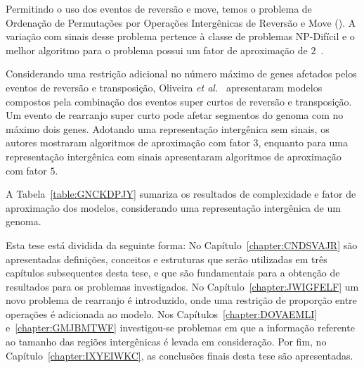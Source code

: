Permitindo o uso dos eventos de reversão e move, temos o problema de Ordenação de Permutações por Operações Intergênicas de Reversão e Move (\SbIRM). A variação com sinais desse problema pertence à classe de problemas NP-Difícil e o melhor algoritmo para o problema possui um fator de aproximação de $2$~\cite{2022b-brito-etal}.

Considerando uma restrição adicional no número máximo de genes afetados pelos eventos de reversão e transposição, Oliveira \textit{et al.}~\cite{2019c-oliveira-etal} apresentaram modelos compostos pela combinação dos eventos super curtos de reversão e transposição. Um evento de rearranjo super curto pode afetar segmentos do genoma com no máximo dois genes. Adotando uma representação intergênica sem sinais, os autores mostraram algoritmos de aproximação com fator $3$, enquanto para uma representação intergênica com sinais apresentaram algoritmos de aproximação com fator $5$.

A Tabela~\ref{table:GNCKDPJY} sumariza os resultados de complexidade e fator de aproximação dos modelos, considerando uma representação intergênica de um genoma.



Esta tese está dividida da seguinte forma: No Capítulo~\ref{chapter:CNDSVAJR} são apresentadas definições, conceitos e estruturas que serão utilizadas em três capítulos subsequentes desta tese, e que são fundamentais para a obtenção de resultados para os problemas investigados. No Capítulo~\ref{chapter:JWIGFELF} um novo problema de rearranjo é introduzido, onde uma restrição de proporção entre operações é adicionada ao modelo. Nos Capítulos~\ref{chapter:DOVAEMLI} e~\ref{chapter:GMJBMTWF} investigou-se problemas em que a informação referente ao tamanho das regiões intergênicas é levada em consideração. Por fim, no Capítulo~\ref{chapter:IXYEIWKC}, as conclusões finais desta tese são apresentadas.

